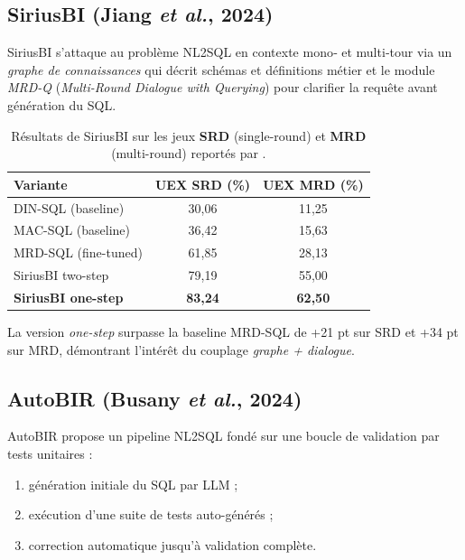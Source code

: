 \documentclass[conference]{IEEEtran}
\begin{document}
\subsection{SiriusBI (Jiang \textit{et al.}, 2024)}

SiriusBI s’attaque au problème NL2SQL en contexte mono‐ et multi‐tour via un \emph{graphe de connaissances} qui décrit schémas et définitions métier et le module \emph{MRD-Q} (\textit{Multi-Round Dialogue with Querying}) pour clarifier la requête avant génération du SQL.

\begin{table}[ht]
\centering
\caption{Résultats de SiriusBI sur les jeux \textbf{SRD} (single-round) et \textbf{MRD} (multi-round) reportés par \citeauthor{jiang2024siriusbi} \citeyearpar{jiang2024siriusbi}.}
\label{tab:siriusbi-results}
\begin{tabular}{|l|c|c|}
\hline
\textbf{Variante} & \textbf{UEX SRD (\%)} & \textbf{UEX MRD (\%)}\\
\hline
DIN-SQL (baseline)          & 30,06 & 11,25 \\
MAC-SQL (baseline)          & 36,42 & 15,63 \\
MRD-SQL (fine-tuned)        & 61,85 & 28,13 \\
SiriusBI two-step           & 79,19 & 55,00 \\
\textbf{SiriusBI one-step}
& \textbf{83,24} 
& \textbf{62,50} \\
\hline
\end{tabular}
\end{table}

La version \emph{one-step} surpasse la baseline MRD-SQL de +21 pt sur SRD et +34 pt sur MRD, démontrant l’intérêt du couplage \textit{graphe + dialogue}.

\subsection{AutoBIR (Busany \textit{et al.}, 2024)}

AutoBIR propose un pipeline NL2SQL fondé sur une boucle de validation par tests unitaires :  
\begin{enumerate}
    \item génération initiale du SQL par LLM ;  
    \item exécution d’une suite de tests auto-générés ;  
    \item correction automatique jusqu’à validation complète.
\end{enumerate}
\end{document}
